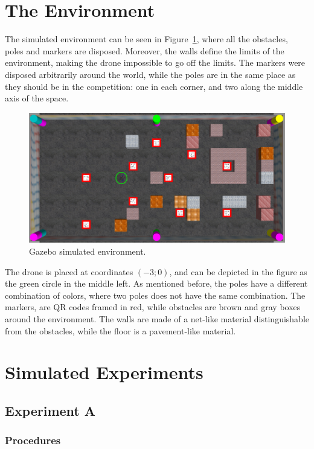\section{The Environment}
\label{sec:chapter3:environment}
The simulated environment can be seen in Figure~\ref{fig:chapter3:env:gazebo}, where all the obstacles, poles and markers are disposed. Moreover, the walls define the limits of the environment, making the drone impossible to go off the limits. The markers were disposed arbitrarily around the world, while the poles are in the same place as they should be in the competition: one in each corner, and two along the middle axis of the space.
\begin{figure}
\centering
\includegraphics[width=\textwidth]{Images/fig18-gazebo-environment}
\caption{Gazebo simulated environment.}
\label{fig:chapter3:env:gazebo}
\end{figure}
The drone is placed at coordinates $(-3;0)$, and can be depicted in the figure as the green circle in the middle left. As mentioned before, the poles have a different combination of colors, where two poles does not have the same combination. The markers, are QR codes framed in red, while obstacles are brown and gray boxes around the environment. The walls are made of a net-like material distinguishable from the obstacles, while the floor is a pavement-like material.

\section{Simulated Experiments}
\label{sec:chapter3:simulation}

\subsection{Experiment A}
\subsubsection{Procedures}
\label{subsec:chapter3:simulation:procedures}

